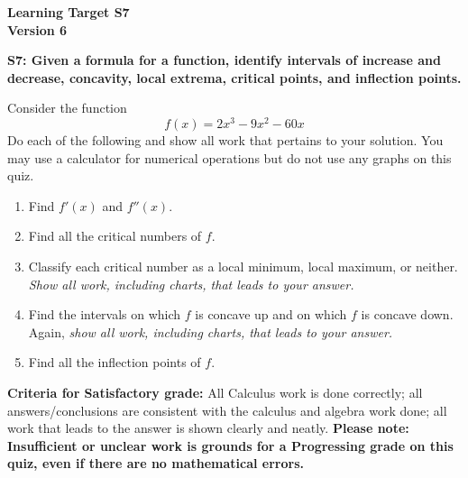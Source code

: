 \documentclass[10pt]{article}
\begin{document}
	\vspace*{0in}

		\begin{center}
			\textbf{Learning Target S7 \\
			Version 6} 
		\end{center}


\begin{framed}
	\textbf{S7: Given a formula for a function, identify intervals of increase and decrease, concavity, local extrema, critical points, and inflection points.}
\end{framed}

Consider the function 
$$f\left( x \right) = 2{x^3} - 9{x^2} - 60x$$
Do each of the following and show all work that pertains to your solution. You may use a calculator for numerical operations but do not use any graphs on this quiz. 
\begin{enumerate}
    \item Find $f'(x)$ and $f''(x)$. 
    \item Find all the critical numbers of $f$.
    \item Classify each critical number as a local minimum, local maximum, or neither. \emph{Show all work, including charts, that leads to your answer.} 
    \item Find the intervals on which $f$ is concave up and on which $f$ is concave down. Again, \emph{show all work, including charts, that leads to your answer.} 
    \item Find all the inflection points of $f$. 
\end{enumerate}

\vfill


\begin{small}
    \begin{framed}
        	\textbf{Criteria for Satisfactory grade:} All Calculus work is done correctly; all answers/conclusions are consistent with the calculus and algebra work done; all work that leads to the answer is shown clearly and neatly. \textbf{Please note: Insufficient or unclear work is grounds for a Progressing grade on this quiz, even if there are no mathematical errors.}
    \end{framed}

\end{small}
\end{document}

